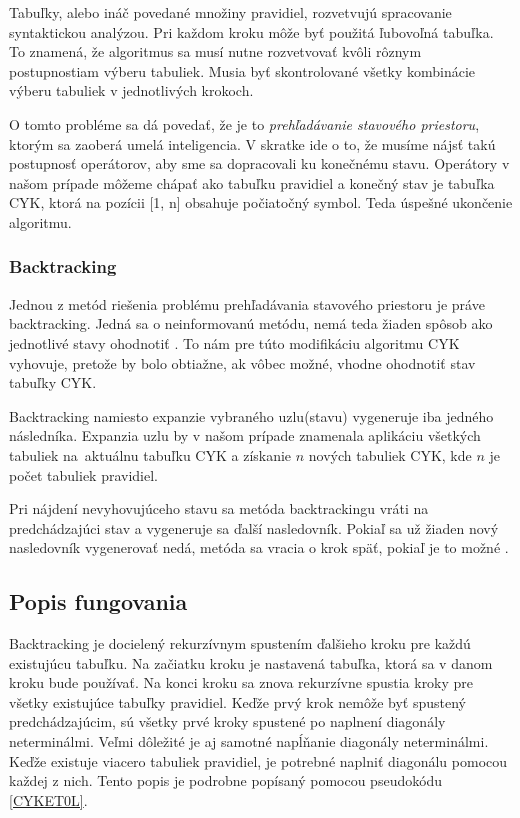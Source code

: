 Tabuľky, alebo ináč povedané množiny pravidiel, rozvetvujú spracovanie syntaktickou analýzou. Pri každom kroku môže byť použitá ľubovoľná tabuľka. To znamená, že algoritmus sa musí nutne rozvetvovať kvôli rôznym postupnostiam výberu tabuliek. Musia byť skontrolované všetky kombinácie výberu tabuliek v jednotlivých krokoch. 

O tomto probléme sa dá povedať, že je to \textit{prehľadávanie stavového priestoru}, ktorým sa zaoberá umelá inteligencia. V skratke ide o to, že musíme nájsť takú postupnosť operátorov, aby sme sa dopracovali ku konečnému stavu. Operátory v našom prípade môžeme chápať ako tabuľku pravidiel a konečný stav je tabuľka CYK, ktorá na pozícii [1, n] obsahuje počiatočný symbol. Teda úspešné ukončenie algoritmu.

\subsubsection*{Backtracking}
Jednou z metód riešenia problému prehľadávania stavového priestoru je práve backtracking. Jedná sa o neinformovanú metódu, nemá teda žiaden spôsob ako jednotlivé stavy ohodnotiť \cite{IZU}. To nám pre túto modifikáciu algoritmu CYK vyhovuje, pretože by bolo obtiažne, ak vôbec možné, vhodne ohodnotiť stav tabuľky CYK.

Backtracking namiesto expanzie vybraného uzlu(stavu) vygeneruje iba jedného následníka. Expanzia uzlu by v našom prípade znamenala aplikáciu všetkých tabuliek na~aktuálnu tabuľku CYK a získanie $n$ nových tabuliek CYK, kde $n$ je počet tabuliek pravidiel.

Pri nájdení nevyhovujúceho stavu sa metóda backtrackingu vráti na predchádzajúci stav a vygeneruje sa ďalší nasledovník. Pokiaľ sa už žiaden nový nasledovník vygenerovať nedá, metóda sa vracia o krok späť, pokiaľ je to možné \cite{IZU}.


\subsection*{Popis fungovania}
Backtracking je docielený rekurzívnym spustením ďalšieho kroku pre každú existujúcu tabuľku. Na začiatku kroku je nastavená tabuľka, ktorá sa v danom kroku bude používať. Na konci kroku sa znova rekurzívne spustia kroky pre všetky existujúce tabuľky pravidiel. Keďže prvý krok nemôže byť spustený predchádzajúcim, sú všetky prvé kroky spustené po naplnení diagonály neterminálmi. Veľmi dôležité je aj samotné napĺňanie diagonály neterminálmi. Keďže existuje viacero tabuliek pravidiel, je potrebné naplniť diagonálu pomocou každej z nich. Tento popis je podrobne popísaný pomocou pseudokódu \ref{CYKET0L}.

